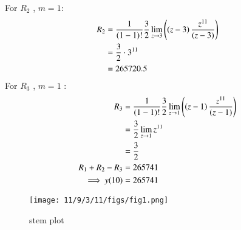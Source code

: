 \documentclass[journal,12pt,twocolumn]{IEEEtran}
\theoremstyle{remark}
\begin{document}
For $R_2$ , $m=1$:
\begin{align}
R_2 &=\frac{1}{\left(1-1\right)!}\frac{3}{2}\lim\limits_{z\to 3}\left(\left(z-3\right)\frac{z^{11}}{\left(z-3\right)}\right) \\
&=\frac{3}{2}\cdot{3^{11}}  \\
&=265720.5
\end{align}
For $R_3$ , $m=1$ :
\begin{align}
R_3 &=\frac{1}{\left(1-1\right)!}\frac{3}{2}\lim\limits_{z\to 1}\left(\left(z-1\right)\frac{z^{11}}{\left(z-1\right)}\right) \\
&=\frac{3}{2}\lim\limits_{z\to1}z^{11}\\
&=\frac{3}{2}\\
 R_1 + R_2 - R_3 &= 265741\\
    \implies  y{(10)} &= 265741
\end{align}
\begin{figure}[b]
    \centering
    \texttt{[image: 11/9/3/11/figs/fig1.png]}
    \caption{stem plot }
    \label{fig:1}
\end{figure}
\end{document}
